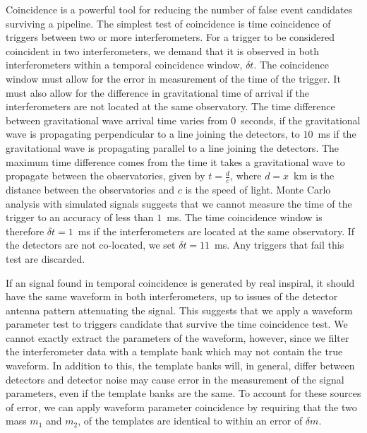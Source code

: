 Coincidence is a powerful tool for reducing the number of false event
candidates surviving a pipeline. The simplest test of coincidence is time
coincidence of triggers between two or more interferometers.  For a trigger to
be considered coincident in two interferometers, we demand that it is observed
in both interferometers within a temporal coincidence window, $\delta t$. The
coincidence window must allow for the error in measurement of the time of the
trigger. It must also allow for the difference in gravitational time of
arrival if the interferometers are not located at the same observatory.  The
time difference between gravitational wave arrival time varies from
$0$~seconds, if the gravitational wave is propagating perpendicular to a line
joining the detectors, to $10$~ms if the gravitational wave is propagating
parallel to a line joining the detectors. The maximum time difference comes
from the time it takes a gravitational wave to propagate between the
observatories, given by $t = \frac{d}{c}$, where $d = x$~km is the distance
between the observatories and $c$ is the speed of light.  Monte Carlo analysis
with simulated signals suggests that we cannot measure the time of the trigger
to an accuracy of less than $1$~ms. The time coincidence window is therefore
$\delta t = 1$~ms if the interferometers are located at the same observatory.
If the detectors are not co-located, we set $\delta t = 11$~ms. Any triggers
that fail this test are discarded. 

If an signal found in temporal coincidence is generated by real inspiral, it
should have the same waveform in both interferometers, up to issues of the
detector antenna pattern attenuating the signal. This suggests that we apply a
waveform parameter test to triggers candidate that survive the time
coincidence test. We cannot exactly extract the parameters of the waveform,
however, since we filter the interferometer data with a template bank which
may not contain the true waveform. In addition to this, the template banks
will, in general, differ between detectors and detector noise may cause error
in the measurement of the signal parameters, even if the template banks are
the same. To account for these sources of error, we can apply waveform
parameter coincidence by requiring that the two mass $m_1$ and $m_2$, of the
templates are identical to within an error of $\delta m$.

